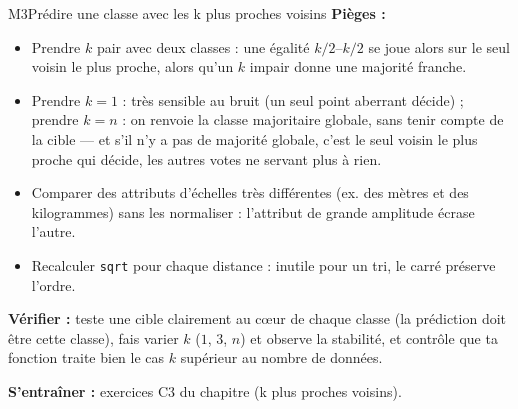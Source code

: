 \begin{fichemethode}{M3}{Prédire une classe avec les k plus proches voisins}
\textbf{Pièges :}
\begin{itemize}
  \item Prendre $k$ pair avec deux classes : une égalité $k/2$--$k/2$ se joue alors sur le seul voisin le plus proche, alors qu'un $k$ impair donne une majorité franche.
  \item Prendre $k = 1$ : très sensible au bruit (un seul point aberrant décide) ;
    prendre $k = n$ : on renvoie la classe majoritaire globale, sans tenir compte de la
    cible — et s'il n'y a pas de majorité globale, c'est le seul voisin le plus proche qui
    décide, les autres votes ne servant plus à rien.
  \item Comparer des attributs d'échelles très différentes (ex. des mètres et des
    kilogrammes) sans les normaliser : l'attribut de grande amplitude écrase l'autre.
  \item Recalculer \lstinline{sqrt} pour chaque distance : inutile pour un tri, le carré préserve l'ordre.
\end{itemize}

\textbf{Vérifier :} teste une cible clairement au cœur de chaque classe (la prédiction doit être cette classe), fais varier $k$ ($1$, $3$, $n$) et observe la stabilité, et contrôle que ta fonction traite bien le cas $k$ supérieur au nombre de données.

\textbf{S'entraîner :} exercices C3 du chapitre (k plus proches voisins).
\end{fichemethode}
